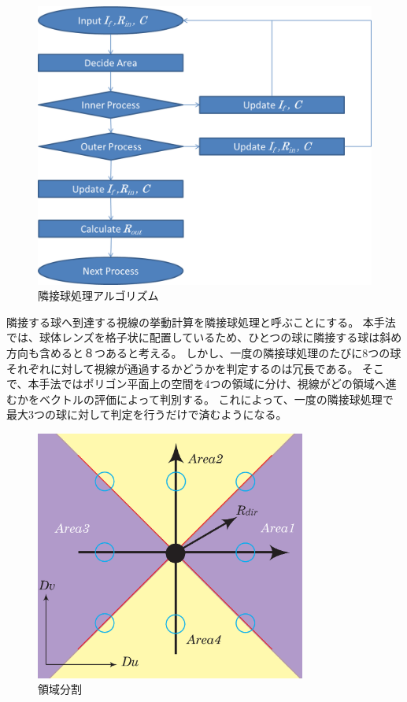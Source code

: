 \begin{figure}[h]
  \centering
  \includegraphics[width=4.5in]{./img/graph/next_sphere_algorithm.png}
  \caption{隣接球処理アルゴリズム}
  \label{FAlgoNextSphere}
\end{figure}

隣接する球へ到達する視線の挙動計算を隣接球処理と呼ぶことにする。
本手法では、球体レンズを格子状に配置しているため、ひとつの球に隣接する球は斜め方向も含めると８つあると考える。
しかし、一度の隣接球処理のたびに8つの球それぞれに対して視線が通過するかどうかを判定するのは冗長である。
そこで、本手法ではポリゴン平面上の空間を4つの領域に分け、視線がどの領域へ進むかをベクトルの評価によって判別する。
これによって、一度の隣接球処理で最大3つの球に対して判定を行うだけで済むようになる。
\begin{figure}[h]
  \centering
  \includegraphics[width=3.5in]{./img/area_division.eps}
  \caption{領域分割}
  \label{FArea}
\end{figure}

